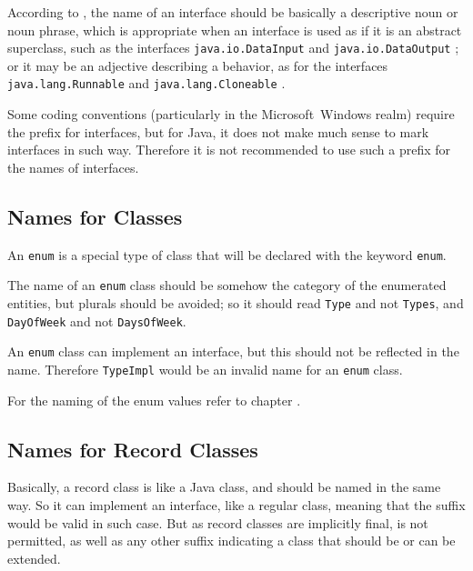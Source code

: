 According to \jls \autocite{ORACLE_DOC_LANGUAGE_SPECIFICATION:Declarations}, the name of an interface should be basically a descriptive noun or noun phrase, which is appropriate when an interface is used as if it is an abstract superclass, such as the interfaces \lstinline|java.io.DataInput| \autocite{ORACLE_DOC_DATAINPUT_INTERFACE} and \lstinline|java.io.DataOutput| \autocite{ORACLE_DOC_DATAOUTPUT_INTERFACE}; or it may be an adjective describing a behavior, as for the interfaces \lstinline|java.lang.Runnable| \autocite{ORACLE_DOC_RUNNABLE_INTERFACE} and \lstinline|java.lang.Cloneable| \autocite{ORACLE_DOC_CLONEABLE_INTERFACE}.

Some coding conventions (particularly in the Microsoft~Windows realm) require the prefix  for interfaces, but for Java, it does not make much sense to mark interfaces in such way. Therefore it is not recommended to use such a prefix for the names of interfaces.


\subsection{Names for  Classes}\label{sec:NamesForEnumClasses}
An \lstinline|enum| is a special type of class that will be declared with the keyword \lstinline|enum|.

The name of an \lstinline|enum| class should be somehow the category of the enumerated entities, but plurals should be avoided; so it should read \lstinline|Type| and not \lstinline|Types|, and \lstinline|DayOfWeek| and not \lstinline|DaysOfWeek|.

An \lstinline|enum| class can implement an interface, but this should not be reflected in the name. Therefore \lstinline|TypeImpl| would be an invalid name for an \lstinline|enum| class.

For the naming of the enum values refer to chapter .


\subsection{Names for Record Classes}\label{sec:NamesForRecordClasses}
Basically, a record class is like a  Java class, and should be named in the same way. So it can implement an interface, like a regular class, meaning that the suffix  would be valid in such case. But as record classes are implicitly final,  is not permitted, as well as any other suffix indicating a class that should be or can be extended.

